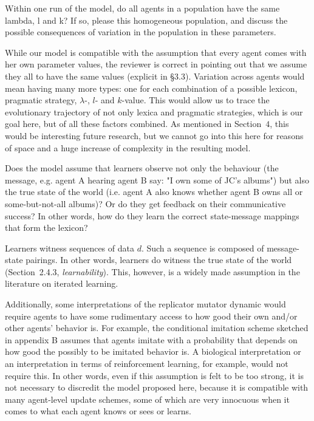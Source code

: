 \documentclass[12pt,a4paper]{article}
\begin{document}
\vspace{.5cm}
  \begin{mdframed}[backgroundcolor=gray!25,linecolor=gray!25]
Within one run of the model, do all agents in a population have the same lambda, l and k? If so, please this homogeneous population, and discuss the possible consequences of variation in the population in these parameters.
\end{mdframed}
While our model is compatible with the assumption that every agent comes with her own parameter
values, the reviewer is correct in pointing out that we assume they all to have the same values
(explicit in \S3.3). Variation across agents would mean having many more types: one for each
combination of a possible lexicon, pragmatic strategy, $\lambda$-, $l$- and $k$-value. This
would allow us to trace the evolutionary trajectory of not only lexica and pragmatic
strategies, which is our goal here, but of all these factors combined. As mentioned in
Section~$4$, this would be interesting future research, but we cannot go into this here for
reasons of space and a huge increase of complexity in the resulting model. 

\vspace{.5cm}
\begin{mdframed}[backgroundcolor=gray!25,linecolor=gray!25]
Does the model assume that learners observe not only the behaviour (the message, e.g. agent A hearing agent B say: "I own some of JC's albums") but also the true state of the world (i.e. agent A also knows whether agent B owns all or some-but-not-all albums)? Or do they get feedback on their communicative success? In other words, how do they learn the correct state-message mappings that form the lexicon? 
\end{mdframed}
Learners witness sequences of data $d$. Such a sequence is composed of message-state
pairings. In other words, learners do witness the true state of the world (Section~2.4.3, {\em
  learnability}). This, however, is a widely made assumption in the literature on iterated
learning. 

Additionally, some interpretations of the replicator mutator dynamic would require agents to
have some rudimentary access to how good their own and/or other agents' behavior is. For
example, the conditional imitation scheme sketched in appendix B assumes that agents imitate
with a probability that depends on how good the possibly to be imitated behavior is. A
biological interpretation or an interpretation in terms of reinforcement learning, for example,
would not require this. In other words, even if this assumption is felt to be too strong, it is
not necessary to discredit the model proposed here, because it is compatible with many
agent-level update schemes, some of which are very innocuous when it comes to what each agent
knows or sees or learns.
\end{document}
